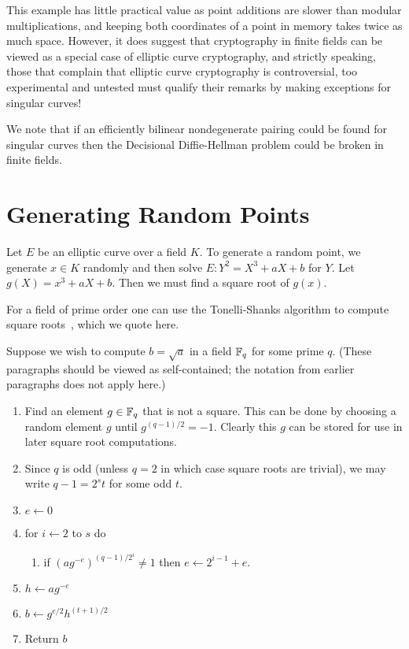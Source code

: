 This example has little practical value as point additions are slower than
modular multiplications, and keeping both coordinates of a point in memory
takes twice as much space. However, it does suggest
that cryptography in finite fields can be viewed as a special
case of elliptic curve cryptography, and strictly speaking,
those that complain that elliptic curve cryptography is controversial,
too experimental and untested must qualify
their remarks by making exceptions for singular curves!

We note that if an efficiently bilinear nondegenerate pairing could be found
for singular curves then the Decisional Diffie-Hellman problem could be broken
in finite fields.

\section {Generating Random Points}

Let $E$ be an elliptic curve over a field $K$.
To generate a random point, we generate $x \in K$ randomly and
then solve $E : Y^2 = X^3 + a X + b$ for $Y$.
Let $g(X) = x^3 + a X + b$. Then
we must find a square root of $g(x)$.

For a field of prime order one can use the Tonelli-Shanks algorithm
to compute square roots~\cite{bss, handbook},
which we quote here.

Suppose we wish to compute $b = \sqrt{a}$ in
a field $\mathbb{F}_q$ for some prime $q$. (These paragraphs should be viewed
as self-contained; the notation from earlier paragraphs does not apply here.)

\begin{enumerate}
\item
Find an element $g \in \mathbb{F}_q$ that is not a square. This can be done
by choosing a random element $g$ until $g^{(q-1)/2} = -1$. 
Clearly this $g$ can be stored for use in later square root computations.
\item
Since $q$ is odd (unless $q = 2$ in which case square roots are trivial),
we may write $q - 1 = 2^s t$ for some odd $t$.
\item
$e \leftarrow 0$
\item
for $i \leftarrow 2$ to $s$ do
\begin{enumerate}
\item
if $(ag^{-e})^{(q-1)/2^i} \ne 1$ then $e \leftarrow 2^{i-1} + e$.
\end{enumerate}
\item
$h \leftarrow ag^{-e}$
\item
$b \leftarrow g^{e/2} h^{(t+1)/2}$
\item
Return $b$
\end{enumerate}

